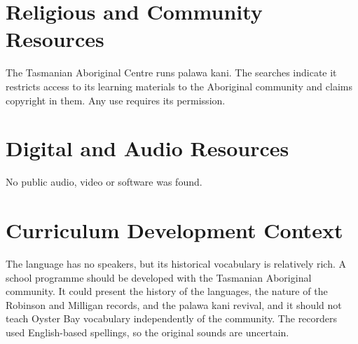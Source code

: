 \documentclass[12pt]{article}
\begin{document}
\section{Religious and Community Resources}
The Tasmanian Aboriginal Centre runs palawa kani. The searches indicate it restricts access to its learning materials to the Aboriginal community and claims copyright in them. Any use requires its permission.

\section{Digital and Audio Resources}
No public audio, video or software was found.

\section{Curriculum Development Context}
The language has no speakers, but its historical vocabulary is relatively rich. A school programme should be developed with the Tasmanian Aboriginal community. It could present the history of the languages, the nature of the Robinson and Milligan records, and the palawa kani revival, and it should not teach Oyster Bay vocabulary independently of the community. The recorders used English-based spellings, so the original sounds are uncertain.
\end{document}
